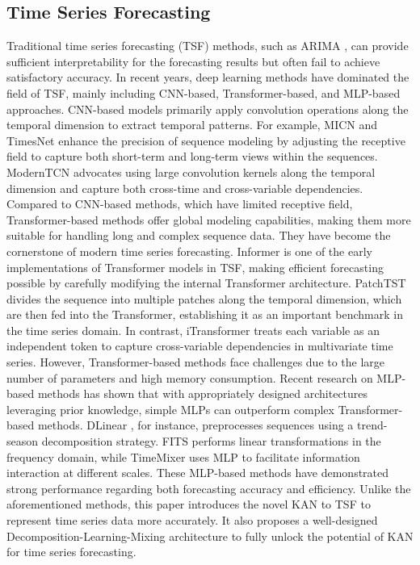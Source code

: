 \subsection{Time Series Forecasting}
Traditional time series forecasting (TSF) methods, such as ARIMA \citep{ZHANG2003arima}, can provide sufficient interpretability for the forecasting results but often fail to achieve satisfactory accuracy. In recent years, deep learning methods have dominated the field of TSF, mainly including CNN-based, Transformer-based, and MLP-based approaches. CNN-based models primarily apply convolution operations along the temporal dimension to extract temporal patterns. For example, MICN \citep{wang2023micn} and TimesNet \citep{wu2023timesnet} enhance the precision of sequence modeling by adjusting the receptive field to capture both short-term and long-term views within the sequences. ModernTCN \citep{donghao2024moderntcn} advocates using large convolution kernels along the temporal dimension and capture both cross-time and cross-variable dependencies.
%
Compared to CNN-based methods, which have limited receptive field, Transformer-based methods offer global modeling capabilities, making them more suitable for handling long and complex sequence data. They have become the cornerstone of modern time series forecasting. Informer \citep{zhou2021informer} is one of the early implementations of Transformer models in TSF, making efficient forecasting possible by carefully modifying the internal Transformer architecture. PatchTST \citep{nie2023patchtst} divides the sequence into multiple patches along the temporal dimension, which are then fed into the Transformer, establishing it as an important benchmark in the time series domain. In contrast, iTransformer \citep{liu2024itransformer} treats each variable as an independent token to capture cross-variable dependencies in multivariate time series. However, Transformer-based methods face challenges due to the large number of parameters and high memory consumption.
%
Recent research on MLP-based methods has shown that with appropriately designed architectures leveraging prior knowledge, simple MLPs can outperform complex Transformer-based methods. DLinear \citep{zeng2023transformers}, for instance, preprocesses sequences using a trend-season decomposition strategy. FITS \citep{xu2024fits} performs linear transformations in the frequency domain, while TimeMixer \citep{wang2024timemixer} uses MLP to facilitate information interaction at different scales. These MLP-based methods have demonstrated strong performance regarding both forecasting accuracy and efficiency.
%
Unlike the aforementioned methods, this paper introduces the novel KAN to TSF to represent time series data more accurately. It also proposes a well-designed Decomposition-Learning-Mixing architecture to fully unlock the potential of KAN for time series forecasting.


